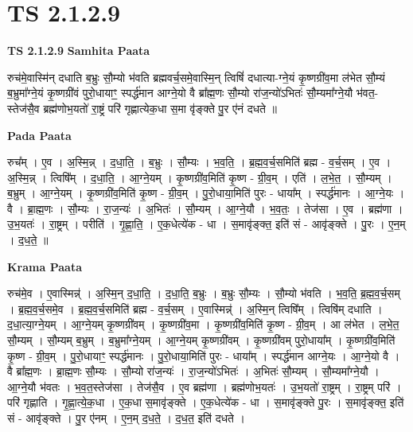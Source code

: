 \documentclass[17pt]{extarticle}
\begin{document}
\section*{ TS 2.1.2.9 }

\textbf{TS 2.1.2.9 } \newline
\textbf{Samhita Paata} \newline

रुच॑मे॒वास्मि॑न् दधाति ब॒भ्रुः सौ॒म्यो भ॑वति ब्रह्मवर्च॒समे॒वास्मि॒न् त्विषिं॑ दधात्या-ग्ने॒यं कृ॒ष्णग्री॑व॒मा ल॑भेत सौ॒म्यं ब॒भ्रुमा᳚ग्ने॒यं कृ॒ष्णग्री॑वं पुरो॒धायाꣳ॒॒ स्पर्द्ध॑मान आग्ने॒यो वै ब्रा᳚ह्म॒णः सौ॒म्यो रा॑ज॒न्यो॑ऽभितः॑ सौ॒म्यमा᳚ग्ने॒यौ भ॑वत॒-स्तेज॑सै॒व ब्रह्म॑णोभ॒यतो॑ रा॒ष्ट्रं परि॑ गृह्णात्येक॒धा स॒मा वृ॑ङ्क्ते पु॒र ए॑नं दधते ॥ \newline

\textbf{Pada Paata} \newline

रुच᳚म् । ए॒व । अ॒स्मि॒न्न् । द॒धा॒ति॒ । ब॒भ्रुः । सौ॒म्यः । भ॒व॒ति॒ । ब्र॒ह्म॒व॒र्च॒समिति॑ ब्रह्म - व॒र्च॒सम् । ए॒व । अ॒स्मि॒न्न् । त्विषि᳚म् । द॒धा॒ति॒ । आ॒ग्ने॒यम् । कृ॒ष्णग्री॑व॒मिति॑ कृ॒ष्ण - ग्री॒व॒म् । एति॑ । ल॒भे॒त॒ । सौ॒म्यम् । ब॒भ्रुम् । आ॒ग्ने॒यम् । कृ॒ष्णग्री॑व॒मिति॑ कृ॒ष्ण - ग्री॒व॒म् । पु॒रो॒धाया॒मिति॑ पुरः - धाया᳚म् । स्पर्द्ध॑मानः । आ॒ग्ने॒यः । वै । ब्रा॒ह्म॒णः । सौ॒म्यः । रा॒ज॒न्यः॑ । अ॒भितः॑ । सौ॒म्यम् । आ॒ग्ने॒यौ । भ॒व॒तः॒ । तेज॑सा । ए॒व । ब्रह्म॑णा । उ॒भ॒यतः॑ । रा॒ष्ट्रम् । परीति॑ । गृ॒ह्णा॒ति॒ । ए॒क॒धेत्ये॑क - धा । स॒मावृ॑ङ्क्त॒ इति॑ सं - आवृ॑ङ्क्ते । पु॒रः । ए॒न॒म् । द॒ध॒ते॒ ॥  \newline


\textbf{Krama Paata} \newline

रुच॑मे॒व । ए॒वास्मिन्न्॑ । अ॒स्मि॒न् द॒धा॒ति॒ । द॒धा॒ति॒ ब॒भ्रुः । ब॒भ्रुः सौ॒म्यः । सौ॒म्यो भ॑वति । भ॒व॒ति॒ ब्र॒ह्म॒व॒र्च॒सम् । ब्र॒ह्म॒व॒र्च॒समे॒व । ब्र॒ह्म॒व॒र्च॒समिति॑ ब्रह्म - व॒र्च॒सम् । ए॒वास्मिन्न्॑ । अ॒स्मि॒न् त्विषि᳚म् । त्विषि॑म् दधाति । द॒धा॒त्या॒ग्ने॒यम् । आ॒ग्ने॒यम् कृ॒ष्णग्री॑वम् । कृ॒ष्णग्री॑व॒मा । कृ॒ष्णग्री॑व॒मिति॑ कृ॒ष्ण - ग्री॒व॒म् । आ ल॑भेत । ल॒भे॒त॒ सौ॒म्यम् । सौ॒म्यम् ब॒भ्रुम् । ब॒भ्रुमा᳚ग्ने॒यम् । आ॒ग्ने॒यम् कृ॒ष्णग्री॑वम् । कृ॒ष्णग्री॑वम् पुरो॒धाया᳚म् । कृ॒ष्णग्री॑व॒मिति॑ कृ॒ष्ण - ग्री॒व॒म् । पु॒रो॒धायाꣳ॒॒ स्पर्द्ध॑मानः । पु॒रो॒धाया॒मिति॑ पुरः - धाया᳚म् । स्पर्द्ध॑मान आग्ने॒यः । आ॒ग्ने॒यो वै । वै ब्रा᳚ह्म॒णः । ब्रा॒ह्म॒णः सौ॒म्यः । सौ॒म्यो रा॑ज॒न्यः॑ । रा॒ज॒न्यो॑ऽभितः॑ । अ॒भितः॑ सौ॒म्यम् । सौ॒म्यमा᳚ग्ने॒यौ । आ॒ग्ने॒यौ भ॑वतः । भ॒व॒त॒स्तेज॑सा । तेज॑सै॒व । ए॒व ब्रह्म॑णा । ब्रह्म॑णोभ॒यतः॑ । उ॒भ॒यतो॑ रा॒ष्ट्रम् । रा॒ष्ट्रम् परि॑ । परि॑ गृह्णाति । गृ॒ह्णा॒त्ये॒क॒धा । ए॒क॒धा स॒मावृ॑ङ्क्ते । ए॒क॒धेत्ये॑क - धा । स॒मावृ॑ङ्क्ते पु॒रः । स॒मावृ॑ङ्क्त॒ इति॑ सं - आवृ॑ङ्क्ते । पु॒र ए॑नम् । ए॒न॒म् द॒ध॒ते॒ । द॒ध॒त॒ इति॑ दधते । \newline
\end{document}

